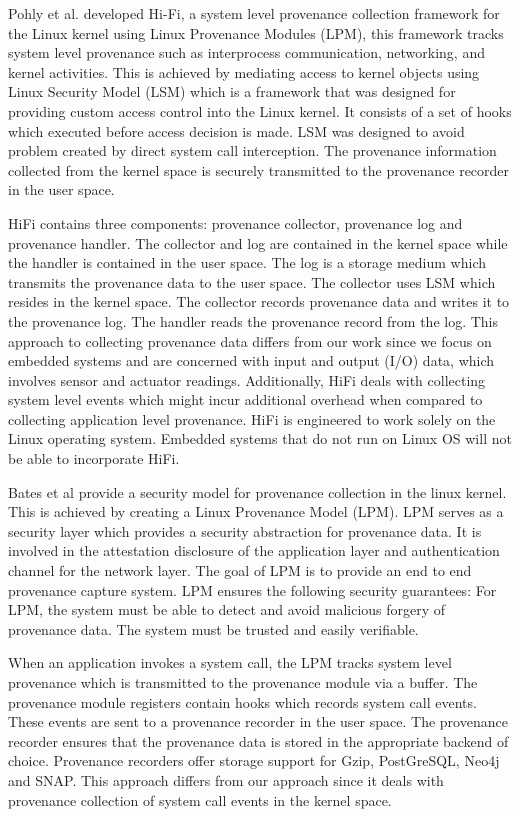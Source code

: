 Pohly et al. \cite{hi_fi}  developed Hi-Fi, a system level provenance collection framework for the Linux kernel using Linux Provenance Modules (LPM), this framework tracks system level provenance such as interprocess communication, networking, and kernel activities. This is achieved by mediating access to kernel objects using Linux Security Model (LSM) which is a framework that was designed for providing custom access control into the Linux kernel. It consists of a set of hooks which executed before access decision is made. LSM was designed to avoid problem created by direct system call interception. The provenance information collected from the kernel space is securely transmitted to the provenance recorder in the user space. 
\par HiFi contains three components: provenance collector, provenance log and provenance handler. The collector and log are contained in the kernel space while the handler is contained in the user space. The log is a storage medium which transmits the provenance data to the user space. The collector uses LSM which resides in the kernel space. The collector records provenance data and writes it to the provenance log. The handler reads the provenance record from the log. This approach to collecting provenance data differs from our work since we focus on embedded systems and are concerned with input and output (I/O) data, which involves sensor and actuator readings. Additionally,  HiFi deals with collecting system level events which might incur additional overhead when compared to collecting application level provenance. HiFi is engineered to work solely on the Linux operating system. Embedded systems that do not run on Linux OS will not be able to incorporate HiFi. 

Bates et al \cite{bates_towards_2013} provide a security model for provenance collection in the linux kernel. This is achieved by creating a Linux Provenance Model (LPM). LPM serves as a security layer which provides a security abstraction for provenance data. It is involved in the attestation disclosure of the application layer and authentication channel for the network layer. The goal of LPM is to provide an end to end provenance capture system. LPM ensures the following security guarantees: For LPM, the system must be able to detect and avoid malicious forgery of provenance data. The system must be trusted and easily verifiable. \par When an application invokes a system call, the LPM tracks system level provenance which is transmitted to the provenance module via a buffer. The provenance module registers contain hooks which records system call events. These events are sent to a provenance recorder in the user space. The provenance recorder ensures that the provenance data is stored in the appropriate backend of choice. Provenance recorders offer storage support for Gzip, PostGreSQL, Neo4j and SNAP. This approach differs from our approach since it deals with provenance collection of system call events in the kernel space.


